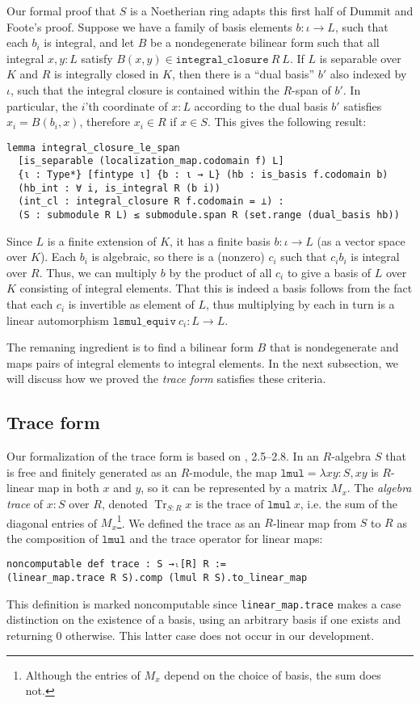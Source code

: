 \documentclass{lipics-v2021}
\newcommand{\lean}[1]{\texttt{#1}\xspace} %
\DeclareMathOperator{\Tr}{\mathrm{Tr}}
\begin{document}
Our formal proof that $S$ is a Noetherian ring adapts this first half of Dummit and Foote's proof.
Suppose we have a family of basis elements $b : \iota \to L$, such that each $b_i$ is integral,
and let $B$ be a nondegenerate bilinear form such that all integral $x, y : L$ satisfy $B(x, y) \in \lean{integral\_closure}\ R\ L$.
If $L$ is separable over $K$ and $R$ is integrally closed in $K$,
then there is a ``dual basis'' $b'$ also indexed by $\iota$, such that the integral closure is contained within the $R$-span of $b'$.
In particular, the $i$'th coordinate of $x : L$ according to the dual basis $b'$ satisfies $x_i = B(b_i, x)$,
therefore $x_i \in R$ if $x \in S$.
This gives the following result:
\begin{lstlisting}
lemma integral_closure_le_span
  [is_separable (localization_map.codomain f) L]
  {ι : Type*} [fintype ι] {b : ι → L} (hb : is_basis f.codomain b)
  (hb_int : ∀ i, is_integral R (b i))
  (int_cl : integral_closure R f.codomain = ⊥) :
  (S : submodule R L) ≤ submodule.span R (set.range (dual_basis hb))
\end{lstlisting}

Since $L$ is a finite extension of $K$, it has a finite basis $b : \iota \to L$ (as a vector space over $K$).
Each $b_i$ is algebraic, so there is a (nonzero) $c_i$ such that $c_i b_i$ is integral over $R$.
Thus, we can multiply $b$ by the product of all $c_i$ to give a basis of $L$ over $K$ consisting of integral elements.
That this is indeed a basis follows from the fact that each $c_i$ is invertible as element of $L$,
thus multiplying by each in turn is a linear automorphism $\lean{lsmul\_equiv}\ c_i : L \to L$.

The remaning ingredient is to find a bilinear form $B$ that is nondegenerate and maps pairs of integral elements to integral elements. In the next subsection, we will discuss how we proved the \emph{trace form} satisfies these criteria.

\subsection{Trace form}
Our formalization of the trace form is based on \cite{Neukirch}, 2.5--2.8.
In an $R$-algebra $S$ that is free and finitely generated as an $R$-module,
the map $\lean{lmul} = \lambda x y : S, xy$ is $R$-linear map in both $x$ and $y$, so it can be represented by a matrix $M_x$.
The \emph{algebra trace} of $x : S$ over $R$, denoted $\Tr_{S : R} x$ is the trace of $\lean{lmul}\ x$, i.e. the sum of the diagonal entries of $M_x$\footnote{Although the entries of $M_x$ depend on the choice of basis, the sum does not.}.
We defined the trace as an $R$-linear map from $S$ to $R$ as the composition of $\lean{lmul}$ and the trace operator for linear maps:
\begin{lstlisting}
noncomputable def trace : S →ₗ[R] R :=
(linear_map.trace R S).comp (lmul R S).to_linear_map
\end{lstlisting}
This definition is marked noncomputable since \lean{linear\_map.trace} makes a case distinction on the existence of a basis,
using an arbitrary basis if one exists and returning $0$ otherwise.
This latter case does not occur in our development.
\end{document}
